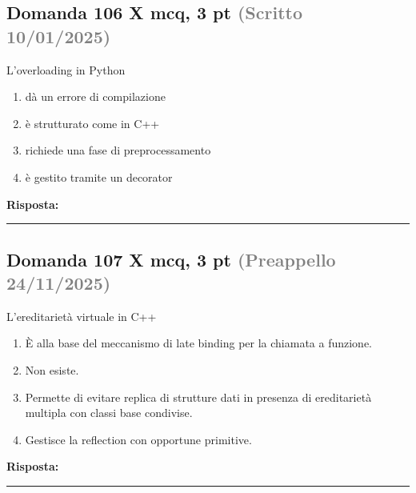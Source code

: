 \documentclass[a4paper,11pt]{article}
\begin{document}
\subsection*{Domanda 106 X \hfill {\small mcq, 3 pt \textcolor{gray}{(Scritto 10/01/2025)}}}
L'overloading in Python

\begin{enumerate}[label=\alph*)]
\item dà un errore di compilazione
\item è strutturato come in C++
\item richiede una fase di preprocessamento
\item è gestito tramite un decorator
\end{enumerate}
\vspace{0.2cm}
\noindent\textbf{Risposta:}\par
\vspace{1.5cm}\hrule


\subsection*{Domanda 107 X \hfill {\small mcq, 3 pt \textcolor{gray}{(Preappello 24/11/2025)}}}
L'ereditarietà virtuale in C++

\begin{enumerate}[label=\alph*)]
\item È alla base del meccanismo di late binding per la chiamata a funzione.
\item Non esiste.
\item Permette di evitare replica di strutture dati in presenza di ereditarietà multipla con classi base condivise.
\item Gestisce la reflection con opportune primitive.
\end{enumerate}
\vspace{0.2cm}
\noindent\textbf{Risposta:}\par
\vspace{1.5cm}\hrule


\end{document}
